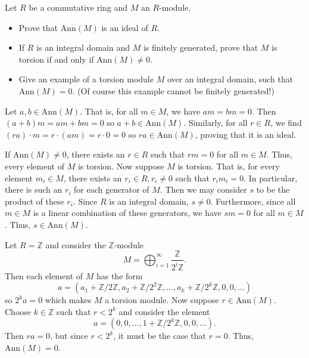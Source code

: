 \documentclass[../../master.tex]{subfiles}
\begin{document}
\begin{problem}
    Let $R$ be a commutative ring and $M$ an $R$-module.
    \begin{itemize}
        \item Prove that $\text{Ann}(M)$ is an ideal of $R$.
        \item If $R$ is an integral domain and $M$ is finitely generated, prove that $M$ is torsion if and only if $\text{Ann}(M) \neq 0$.
        \item Give an example of a torsion module $M$ over an integral domain, such that $\text{Ann}(M) = 0$.
            (Of course this example cannot be finitely generated!)
    \end{itemize}
\end{problem}

\begin{solution}
    Let $a, b \in \text{Ann}(M)$.
    That is, for all $m \in M$, we have $am = bm = 0$.
    Then $(a + b)m = am + bm = 0$ so $a + b \in \text{Ann}(M)$.
    Similarly, for all $r \in R$, we find $(ra) \cdot m = r \cdot (am) = r \cdot 0 = 0$ so $ra \in \text{Ann}(M)$, proving that it is an ideal.

    If $\text{Ann}(M) \neq 0$, there exists an $r \in R$ such that $rm = 0$ for all $m \in M$.
    Thus, every element of $M$ is torsion.
    Now suppose $M$ is torsion.
    That is, for every element $m_i \in M$, there exists an $r_i \in R, r_i \neq 0$ such that $r_i m_i = 0$.
    In particular, there is such an $r_i$ for each generator of $M$.
    Then we may consider $s$ to be the product of these $r_i$.
    Since $R$ is an integral domain, $s \neq 0$.
    Furthermore, since all $m \in M$ is a linear combination of these generators, we have $sm = 0$ for all $m \in M$.
    Thus, $s \in \text{Ann}(M)$.

    Let $R = \mathbb{Z}$ and consider the $\mathbb{Z}$-module
    \[
        M = \bigoplus_{i=1}^{\infty} \frac{\mathbb{Z}}{2^{i}\mathbb{Z}}.
    \]
    Then each element of $M$ has the form
    \[
        a = (a_1 + \mathbb{Z}/2\mathbb{Z}, a_2 + \mathbb{Z}/2^2\mathbb{Z}, \ldots, a_k + \mathbb{Z}/2^{k}\mathbb{Z}, 0, 0, \ldots)
    \]
    so $2^{k}a = 0$ which makes $M$ a torsion module.
    Now suppose $r \in \text{Ann}(M)$.
    Choose $k \in \mathbb{Z}$ such that $r < 2^{k}$ and consider the element
    \[
        a = (0, 0, \ldots, 1 + \mathbb{Z}/2^{k}\mathbb{Z}, 0, 0, \ldots).
    \]
    Then $ra = 0$, but since $r < 2^{k}$, it must be the case that $r = 0$.
    Thus, $\text{Ann}(M) = 0$.
\end{solution}
\end{document}
